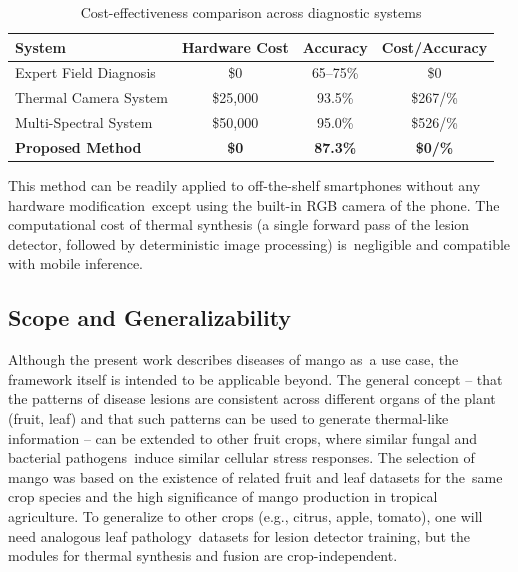 \documentclass[utf8]{FrontiersinHarvard} %
\begin{document}
\begin{table}[h!]
    \centering
    \caption{Cost-effectiveness comparison across diagnostic systems}
    \label{tab:cost}
    \footnotesize
    \begin{tabular}{lccc}
        \toprule
        \textbf{System} & \textbf{Hardware Cost} & \textbf{Accuracy} & \textbf{Cost/Accuracy} \\
        \midrule
        Expert Field Diagnosis & \$0 & 65--75\% & \$0 \\
        Thermal Camera System & \$25,000 & 93.5\% & \$267/\% \\
        Multi-Spectral System & \$50,000 & 95.0\% & \$526/\% \\
        \textbf{Proposed Method} & \textbf{\$0} & \textbf{87.3\%} & \textbf{\$0/\%} \\
        \bottomrule
    \end{tabular}
\end{table}
This method can be readily applied to off-the-shelf smartphones without any hardware modification except using the built-in RGB camera of the phone. The computational cost of thermal synthesis (a single forward pass of the lesion detector, followed by deterministic image processing) is negligible and compatible with mobile inference. 

\subsection{Scope and Generalizability}
Although the present work describes diseases of mango as a use case, the framework itself is intended to be applicable beyond. The general concept – that the patterns of disease lesions are consistent across different organs of the plant (fruit, leaf) and that such patterns can be used to generate thermal-like information – can be extended to other fruit crops, where similar fungal and bacterial pathogens induce similar cellular stress responses. The selection of mango was based on the existence of related fruit and leaf datasets for the same crop species and the high significance of mango production in tropical agriculture. To generalize to other crops (e.g., citrus, apple, tomato), one will need analogous leaf pathology datasets for lesion detector training, but the modules for thermal synthesis and fusion are crop-independent. 
\end{document}
